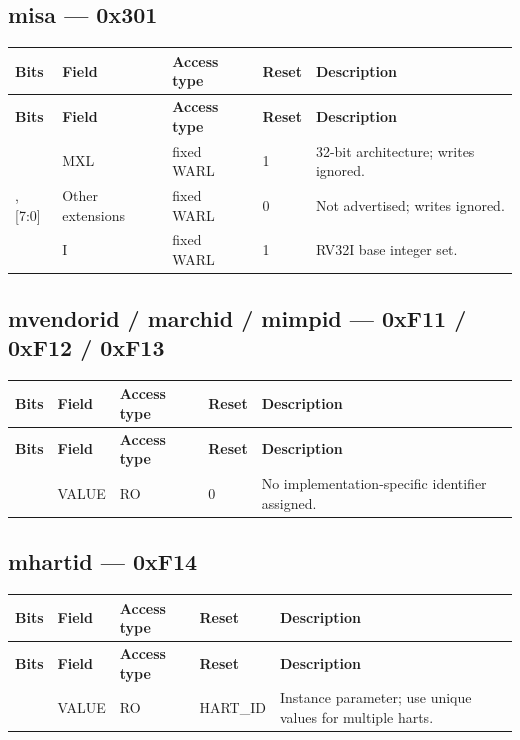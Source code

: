 \documentclass[11pt]{article}
\begin{document}
\subsection*{misa — 0x301}
{\small
\begin{longtable}{@{}L{0.1200\dimexpr\linewidth-48pt\relax}L{0.1800\dimexpr\linewidth-48pt\relax}L{0.1200\dimexpr\linewidth-48pt\relax}L{0.1200\dimexpr\linewidth-48pt\relax}L{0.4600\dimexpr\linewidth-48pt\relax}@{}}
\toprule
\textbf{Bits} & \textbf{Field} & \textbf{Access type} & \textbf{Reset} & \textbf{Description} \\ \midrule
\endfirsthead
\toprule
\textbf{Bits} & \textbf{Field} & \textbf{Access type} & \textbf{Reset} & \textbf{Description} \\ \midrule
\endhead
[31:30] & MXL & fixed WARL & 1 & 32-bit architecture; writes ignored. \\ \addlinespace[3pt]
[29:9], [7:0] & Other extensions & fixed WARL & 0 & Not advertised; writes ignored. \\ \addlinespace[3pt]
[8] & I & fixed WARL & 1 & RV32I base integer set. \\*
\bottomrule\end{longtable}}
\subsection*{mvendorid / marchid / mimpid — 0xF11 / 0xF12 / 0xF13}
{\small
\begin{longtable}{@{}L{0.1200\dimexpr\linewidth-48pt\relax}L{0.1800\dimexpr\linewidth-48pt\relax}L{0.1200\dimexpr\linewidth-48pt\relax}L{0.1200\dimexpr\linewidth-48pt\relax}L{0.4600\dimexpr\linewidth-48pt\relax}@{}}
\toprule
\textbf{Bits} & \textbf{Field} & \textbf{Access type} & \textbf{Reset} & \textbf{Description} \\ \midrule
\endfirsthead
\toprule
\textbf{Bits} & \textbf{Field} & \textbf{Access type} & \textbf{Reset} & \textbf{Description} \\ \midrule
\endhead
[31:0] & VALUE & RO & 0 & No implementation-specific identifier assigned. \\*
\bottomrule\end{longtable}}
\subsection*{mhartid — 0xF14}
{\small
\begin{longtable}{@{}L{0.1200\dimexpr\linewidth-48pt\relax}L{0.1800\dimexpr\linewidth-48pt\relax}L{0.1200\dimexpr\linewidth-48pt\relax}L{0.1200\dimexpr\linewidth-48pt\relax}L{0.4600\dimexpr\linewidth-48pt\relax}@{}}
\toprule
\textbf{Bits} & \textbf{Field} & \textbf{Access type} & \textbf{Reset} & \textbf{Description} \\ \midrule
\endfirsthead
\toprule
\textbf{Bits} & \textbf{Field} & \textbf{Access type} & \textbf{Reset} & \textbf{Description} \\ \midrule
\endhead
[31:0] & VALUE & RO & HART\_ID & Instance parameter; use unique values for multiple harts. \\*
\bottomrule\end{longtable}}
\end{document}
